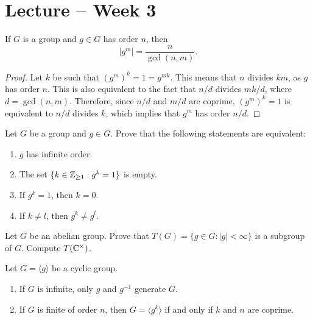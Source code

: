 \section{Lecture -- Week 3}

\begin{corollary}
        If $G$ is a group and $g\in G$ has order $n$, 
        then 
        \[
        |g^m|=\frac{n}{\gcd(n,m)}.
        \]
        \end{corollary}
        
\begin{proof}
        Let $k$ be such that $(g^m)^k=1=g^{mk}$. This means that $n$ divides $km$, as $g$ 
        has order $n$. This is also equivalent to the fact that 
        $n/d$ divides $mk/d$, where $d=\gcd(n,m)$. Therefore, since $n/d$ and $m/d$ 
        are coprime, $(g^m)^k=1$ is equivalent to  
        $n/d$ divides $k$, which implies that $g^m$ has order $n/
        d$.
\end{proof}
        
\begin{exercise}
        Let $G$ be a group and $g\in G$. Prove that the following statements are equivalent:
        \begin{enumerate}
        \item $g$ has infinite order. 
        \item The set $\{k\in\mathbb{Z}_{\geq1}:g^k=1\}$ is empty.
        \item If $g^k=1$, then $k=0$.
        \item If $k\ne l$, then $g^k\ne g^l$.
        \end{enumerate}
\end{exercise}

\begin{exercise}
        Let $G$ be an abelian group. Prove that 
        $T(G)=\{g\in G:|g|<\infty\}$ is a subgroup of $G$. Compute $T(\mathbb{C}^\times)$.
\end{exercise}
                
\begin{exercise}
        Let $G=\langle g\rangle$ be a cyclic group. 
        \begin{enumerate}
                \item If $G$ is infinite, only $g$ and $g^{-1}$ generate $G$.
                \item If $G$ is finite of order $n$, then 
                        $G=\langle g^k\rangle$ if and only if $k$ and $n$ are coprime.
        \end{enumerate}
\end{exercise}
                
